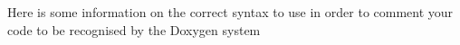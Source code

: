 Here is some information on the correct syntax to use in order to comment your code to be recognised by the Doxygen system 